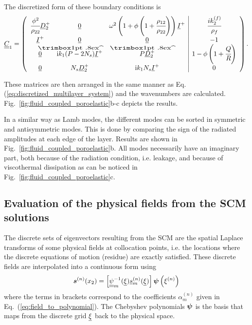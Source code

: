    The discretized form of these boundary conditions is
    \begin{equation}
        \nummat C_{1} = \left(
            \begin{array}{ccc|c}
                \cfrac{\phi^2}{ \rho_{22}} \numvec D_2^+ & \numvec 0 & \omega^2 \left(1 + \phi \left( 1 + \cfrac{ \rho_{12}}{ \rho_{22}}\right) \right) \numvec I^+ & \cfrac{ik_2^{(f)}}{\rho_f}  \\
                \numvec I^+ & \numvec 0 & \numvec 0 & -1 \\
                \numvec 0 & \im  k_1 (\hat P - 2 N_s) \numvec I^+ & \hat P \numvec D_2^+ & 1 - \phi \left(1+ \cfrac{ Q} { R}\right) \\
                \numvec 0 &  N_s \numvec D_2^+ & \im  k_1  N_s \numvec I^+ & 0 \\
            \end{array} \right).
            \label{eq:fluid_poro_coupling_top}
        \end{equation}
        
    
    These matrices are then arranged in the same manner as Eq.(\ref{eq:discretized_multilayer_system}) and the wavenumbers are calculated. Fig.~\ref{fig:fluid_coupled_poroelastic}b-c depicts the results. 
    
 In a similar way as Lamb modes, the different modes can be sorted in symmetric and antisymmetric modes. This is done by comparing the sign of the radiated amplitudes at each edge of the layer. Results are shown in Fig.~\ref{fig:fluid_coupled_poroelastic}b. All modes necessarily have an imaginary part, both because of the radiation condition, i.e. leakage, and because of viscothermal dissipation as can be noticed in Fig.~\ref{fig:fluid_coupled_poroelastic}c.

\subsection{Evaluation of the physical fields from the SCM solutions}
\label{app:fields}

The discrete sets of eigenvectors resulting from the SCM are the spatial Laplace transforms of some physical fields at collocation points, i.e. the locations where the discrete equations of motion (residue) are exactly satisfied. These discrete fields are interpolated into a continuous form using
\begin{equation}
    \boldsymbol s^{(n)}(x_2) = \left[\underline{\underline{\psi}}_m^{-1}(\underline{\xi})  \underline{s}_m^{(n)}(\underline{\xi}) \right] \boldsymbol \psi\left( \xi^{(n)} \right)
    \label{eq:reinterpolation}
\end{equation}
where the terms in brackets correspond to the coefficients $\alpha^{(n)}_m$ given in Eq.~(\ref{eq:field_to_polynomial}). The Chebyshev polynomials $\boldsymbol \psi$ is the basis that maps from the discrete grid $\underline{\xi}$ back to the physical space. 

